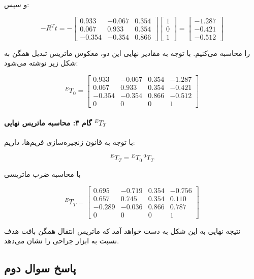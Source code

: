 \documentclass{article}
\begin{document}
و سپس:

\[
-R^{T}t=
-
\begin{bmatrix}
	0.933 & -0.067 & 0.354\\
	0.067 & 0.933 & 0.354\\
	-0.354 & -0.354 & 0.866
\end{bmatrix}
\begin{bmatrix}
	1\\0\\1
\end{bmatrix}
=
\begin{bmatrix}
	-1.287\\
	-0.421\\
	-0.512
\end{bmatrix}
\]

را محاسبه می‌کنیم. با توجه به مقادیر نهایی این دو، معکوس ماتریس تبدیل همگن به شکل زیر نوشته می‌شود:


\[
{}^{E}T_{0}=
\begin{bmatrix}
	0.933 & -0.067 & 0.354 & -1.287\\
	0.067 & 0.933 & 0.354 & -0.421\\
	-0.354 & -0.354 & 0.866 & -0.512\\
	0 & 0 & 0 & 1
\end{bmatrix}
\]

\paragraph{گام ۳: محاسبه ماتریس نهایی \({}^{E}T_{T}\)}

با توجه به قانون زنجیره‌سازی فریم‌ها، داریم:

\[
{}^{E}T_{T} = {}^{E}T_{0}\, {}^{0}T_{T}
\]

با محاسبه ضرب ماتریسی

\[
{}^{E}T_{T} =
\begin{bmatrix}
	0.695 & -0.719 & 0.354 & -0.756\\
	0.657 & 0.745 & 0.354 & 0.110\\
	-0.289 & -0.036 & 0.866 & 0.787\\
	0 & 0 & 0 & 1
\end{bmatrix}
\]

نتیجه نهایی به این شکل به دست خواهد آمد که ماتریس انتقال همگن بافت هدف نسبت به ابزار جراحی را نشان می‌دهد.


\subsection{پاسخ سوال دوم}
\end{document}

